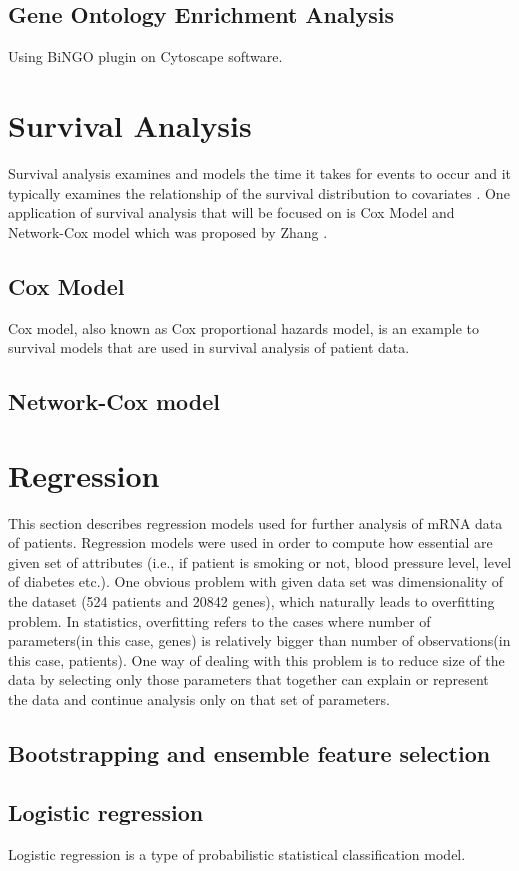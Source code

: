 \documentclass{ba-kecs}
\numberwithin{figure}{section}
\numberwithin{equation}{section}
\begin{document}
\subsection{Gene Ontology Enrichment Analysis}
Using BiNGO plugin on Cytoscape software.


\section{Survival Analysis}
Survival analysis examines and models the time it takes for events to occur and it typically examines the relationship of the survival distribution to covariates \cite{cox}. One application of survival analysis that will be focused on is Cox Model and Network-Cox model which was proposed by Zhang \cite{netcox}.
\subsection{Cox Model}
Cox model, also known as Cox proportional hazards model, is an example to survival models that are used in survival analysis of patient data. 
\subsection{Network-Cox model}

\section{Regression}
This section describes regression models used for further analysis of mRNA data of patients. Regression models were used in order to compute how essential are given set of attributes (i.e., if patient is smoking or not, blood pressure level, level of diabetes etc.). One obvious problem with given data set was dimensionality of the dataset (524 patients and 20842 genes), which naturally leads to overfitting problem. In statistics, overfitting refers to the cases where number of parameters(in this case, genes) is relatively bigger than number of observations(in this case, patients). One way of dealing with this problem is to reduce size of the data by selecting only those parameters that together can explain or represent the data and continue analysis only on that set of parameters.
\subsection{Bootstrapping and ensemble feature selection}
\subsection{Logistic regression}
Logistic regression is a type of probabilistic statistical classification model.
\end{document}
